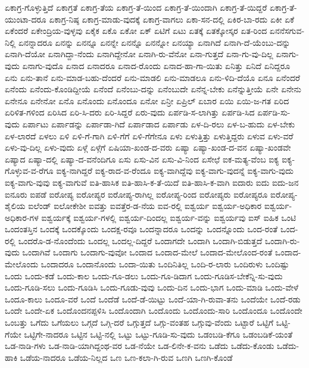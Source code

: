 {ಏಕಾಗ್ರ-ಗೊಳ್ಳುತ್ತಿದೆ
ಏಕಾಗ್ರತೆ
ಏಕಾಗ್ರ-ತೆಯ
ಏಕಾಗ್ರ-ತೆ-ಯಿಂದ
ಏಕಾಗ್ರ-ತೆ-ಯಿಂದಾಗಿ
ಏಕಾಗ್ರ-ತೆ-ಯಿದ್ದರೆ
ಏಕಾಗ್ರ-ತೆ-ಯುಂಟಾ-ದರೂ
ಏಕಾಗ್ರ-ನಿಷ್ಠ
ಏಕಾಗ್ರ-ಮಾಡು-ವುದಕ್ಕೆ
ಏಕಾಗ್ರ-ವಾಗಲು
ಏಕಾ-ಸನ-ದಲ್ಲಿ
ಏಕಿರ-ಬಾ-ರದು
ಏಕೀ
ಏಕೆ
ಏಕೆಂದರೆ
ಏಕೇಂದ್ರಿಯ-ವುಳ್ಳವು
ಏಕೈಕ
ಏಕೊ
ಏಕೋ
ಏಕ್
ಏಟಿಗೆ
ಏಟು
ಏತಕ್ಕೆ
ಏತಕ್ಕೋಸ್ಕರ
ಏತ-ರಿಂದ
ಏನನೆಸಗುವ-ನಿಲ್ಲಿ
ಏನನ್ನಾದರೂ
ಏನನ್ನು
ಏನನ್ನೂ
ಏನನ್ನೇ
ಏನನ್ನೊ
ಏನನ್ನೋ
ಏನಯ್ಯಾ
ಏನಾಗಿದೆ
ಏನಾಗಿ-ದೆ-ಯೆಂಬು-ದನ್ನು
ಏನಾಗಿ-ದೆಯೋ
ಏನಾಗಿದ್ದಾ-ನೆಂದು
ಏನಾಗಿದ್ದೇನೋ
ಏನಾಗಿ-ರು-ವೆನೋ
ಏನಾ-ಗುತ್ತದೆ
ಏನಾ-ಗು-ವು-ದಿಲ್ಲ
ಏನಾಗು-ವುದು
ಏನಾಗು-ವುದೊ
ಏನಾದ
ಏನಾದರೂ
ಏನಾದ-ರೊಂದು
ಏನಾದ-ಹಾ-ಗಾ-ಯಿತು
ಏನಿತ್ತು
ಏನಿದೆ
ಏನಿದ್ದರೂ
ಏನು
ಏನು-ತಾನೆ
ಏನು-ಮಾಡ-ಬಹು-ದೆಂದರೆ
ಏನು-ಮಾಡಲಿ
ಏನು-ಮಾಡಲೂ
ಏನು-ಳಿದಿ-ದೆಯೊ
ಏನೂ
ಏನೆಂದರೆ
ಏನೆಂದು
ಏನೆಂದು-ಕೊಂಡಿದ್ದೀಯೆ
ಏನೆಂದೆ
ಏನೆಂಬು-ದನ್ನು
ಏನೆಂಬುದೇ
ಏನೆನ್ನ-ಬೇಕು
ಏನೆನ್ನುತ್ತೀಯೆ
ಏನೇ
ಏನೇನು
ಏನೇನೂ
ಏನೇನೋ
ಏನೊ
ಏನೊಂದು
ಏನೊಂದೂ
ಏನೋ
ಏನ್ರೀ
ಏಪ್ರಿಲ್
ಏಬಾರ
ಏಯಿ
ಏಯಿ-ಜ-ಗತ
ಏರಿದ
ಏರಿಳಿತ-ಗಳಿಂದ
ಏರಿಸಿದ
ಏರಿ-ಸಿ-ದರು
ಏರಿ-ಸಿದ್ದರೆ
ಏರು-ವುದು
ಏರ್ಪಡಿ-ಸ-ಲಾಗಿತ್ತು
ಏರ್ಪಡಿ-ಸಿದ
ಏರ್ಪಡಿ-ಸು-ವುದು
ಏರ್ಪಾಟು
ಏರ್ಪಾಡನ್ನು
ಏರ್ಪಾಡಾ-ಗಿದೆ
ಏರ್ಪಾಡಾದ
ಏರ್ಪಾಡು
ಏಳ-ದಿ-ರಲು
ಏಳ-ಬ-ಹುದು
ಏಳ-ಬೇಕು
ಏಳ-ಲಾರದೆ
ಏಳಲು
ಏಳಿ
ಏಳಿ-ಗೆ-ಗಾಗಿ
ಏಳಿ-ಗೆಗೆ
ಏಳಿ-ಗೆಗೇನೂ
ಏಳು
ಏಳುತ್ತಿತ್ತು
ಏಳುತ್ತಿದ್ದರು
ಏಳುವ
ಏಳು-ವರೆ
ಏಳು-ವು-ದಿಲ್ಲ
ಏಳು-ವುದು
ಏಳ್ಗೆ
ಏಳ್ಗೆಗೆ
ಏಷಿಯಾ-ಖಂಡ-ದ-ವರು
ಏಷ್ಯಾ
ಏಷ್ಯಾ-ಖಂಡ-ದ-ವನ
ಏಷ್ಯಾ-ಖಂಡವೇ
ಏಷ್ಯಾದ
ಏಷ್ಯಾ-ದಲ್ಲಿ
ಏಷ್ಯಾ-ದ-ವನೆಂದಿಗೂ
ಏಸು
ಏಸು-ವಿನ
ಏಸು-ವಿ-ನಿಂದ
ಏಸೇಛೆ
ಐಕ-ಮತ್ಯ-ವೆಂಬ
ಐಕ್ಯ
ಐಕ್ಯ-ಗೊಳ್ಳುವ-ವ-ರೆಗೂ
ಐಕ್ಯ-ನಾಗಿದ್ದರೆ
ಐಕ್ಯ-ರಾದ-ವ-ರೆಂದೂ
ಐಕ್ಯ-ವಾಗಿದ್ದೆವು
ಐಕ್ಯ-ವಾಗು-ವುದನ್ನೆ
ಐಕ್ಯ-ವಾಗು-ವುದು
ಐಕ್ಯ-ವಾಗು-ವುವು
ಐಕ್ಯ-ವಾಗುವೆ
ಐತಿ-ಹಾಸಿಕ
ಐತಿ-ಹಾಸಿ-ಕ-ತೆ-ಯಿದೆ
ಐತಿ-ಹಾಸಿ-ಕ-ವಾಗಿ
ಐದಾರು
ಐದು
ಐದು-ಜನ
ಐನೂರು
ಐಪಡೆ
ಐರೋಪ್ಯ
ಐರೋಪ್ಯರ
ಐರೋಪ್ಯ-ರಾಗಿಲ್ಲ
ಐರೋಪ್ಯ-ರಿಂದ
ಐರೋಪ್ಯರು
ಐರೋಪ್ಯರೂ
ಐರೋಪ್ಯ-ಶೈಲಿಯ
ಐಲೆಂಡ್
ಐಲೋಕೇಶೀ
ಐವತ್ತು
ಐವತ್ತೆರ-ಡ-ನೆಯ
ಐವ-ರಲ್ಲಿ
ಐಶ್ವರ್ಯ
ಐಶ್ವರ್ಯ-ಅಧಿಕಾರ
ಐಶ್ವರ್ಯ-ಅಧಿಕಾರ-ಗಳ
ಐಶ್ವರ್ಯಕ್ಕೆ
ಐಶ್ವರ್ಯ-ಗಳಲ್ಲಿ
ಐಶ್ವರ್ಯ-ದಿಂದಲ್ಲ
ಐಶ್ವರ್ಯ-ವನ್ನು
ಐಶ್ವರ್ಯವು
ಐಸ್
ಐಹಿಕ
ಒಂಟಿ
ಒಂದಂತಸ್ತಿನ
ಒಂದಕ್ಕೆ
ಒಂದಕ್ಕೊಂದು
ಒಂದಕ್ಷ-ರವೂ
ಒಂದನ್ನಾದರೂ
ಒಂದನ್ನು
ಒಂದನ್ನೊಂದು
ಒಂದ-ರಂತೆ
ಒಂದ-ರಲ್ಲಿ
ಒಂದರೊ-ಡ-ನೊಂದೆಂದು
ಒಂದಲ್ಲ
ಒಂದಲ್ಲ-ದಿದ್ದರೆ
ಒಂದಾಗದೇ
ಒಂದಾಗಿ
ಒಂದಾಗಿ-ಬಿಡುತ್ತದೆ
ಒಂದಾಗಿ-ರು-ವುದು
ಒಂದಾಗಿವೆ
ಒಂದಾಗು
ಒಂದಾಗು-ವುವೋ
ಒಂದಾದ
ಒಂದಾದ-ಮೇಲೆ
ಒಂದಾದ-ಮೇಲೊಂದ-ರಂತೆ
ಒಂದಾದ-ಮೇಲೊಂದು
ಒಂದಾದರೂ
ಒಂದಾನೊಂದು
ಒಂದಾ-ಯಿತು
ಒಂದಿನಿತಿಲ್ಲ
ಒಂದಿ-ರ-ಲಾರು
ಒಂದಿರುಳು
ಒಂದಿಷ್ಟು
ಒಂದು
ಒಂದು-ಕಡೆ
ಒಂದು-ಕಾಲ
ಒಂದು-ಗೂ-ಡಲು
ಒಂದು-ಗೂ-ಡಿದಾಗ
ಒಂದು-ಗೂಡಿಸ-ಬೇಕೆನ್ನಿ-ಸು-ವುದು
ಒಂದು-ಗೂಡಿ-ಸಲು
ಒಂದು-ಗೂಡಿಸಿ
ಒಂದು-ಗೂಡು-ವುವು
ಒಂದು-ದಿನ
ಒಂದು-ಭಾಗ
ಒಂದು-ಮಾಡಿ
ಒಂದು-ವೇಳೆ
ಒಂದೂ-ಕಾಲು
ಒಂದೂ-ವರೆ
ಒಂದೆ
ಒಂದೆಡೆ
ಒಂದೆ-ಡೆ-ಯಿಟ್ಟು
ಒಂದೆ-ಯಾ-ಗಿ-ರುವಾ-ತನು
ಒಂದೆಯೇ
ಒಂದೆ-ರಡು
ಒಂದೇ
ಒಂದೇ-ಏಕ
ಒಂದೊಂದನಪ್ಪಳಿಸಿ
ಒಂದೊಂದಾಗಿ
ಒಂದೊಂದು
ಒಂದೊಂದು-ಸಾರಿ
ಒಂದೊಂದೂ
ಒಂದೊಂದೇ
ಒಂಬತ್ತು
ಒಗೆದು
ಒಗೆಯಲು
ಒಗ್ಗದೆ
ಒಗ್ಗಿ-ದರೆ
ಒಗ್ಗುತ್ತದೆ
ಒಗ್ಗು-ವಂತಹ
ಒಗ್ಗುವು-ವೆಂದು
ಒಟ್ಟಾರೆ
ಒಟ್ಟಿಗೆ
ಒಟ್ಟಿ-ಗೆಯೇ
ಒಟ್ಟಿಗೇ-ನಾದರೂ
ಒಟ್ಟಿನ
ಒಟ್ಟಿ-ನಲ್ಲಿ
ಒಟ್ಟು
ಒಟ್ಟು-ಗೂಡಿ-ಸು-ವುದು
ಒಡಂಬಡಿ-ಕೆಗೂ
ಒಡಂಬಡಿಕೆ-ಯಂತೆ
ಒಡ-ನಾಡಿ-ಗಳು
ಒಡ-ನಾಡಿ-ಯಾಗಿದ್ದಂಥ-ವರ
ಒಡ-ನೆಯೇ
ಒಡ-ಲಿನೇ-ಕ-ವನು
ಒಡೆದು
ಒಡೆದು-ಕೊಂಡು
ಒಡೆದು-ಹಾಕಿ
ಒಡೆಯ-ನಾದರೂ
ಒಡೆಯ-ನಿಲ್ಲದ
ಒಣ
ಒಣ-ಕಲಾ-ಗಿ-ರುವ
ಒಣಗಿ
ಒಣಗಿ-ಕೊಂಡೆ
}
